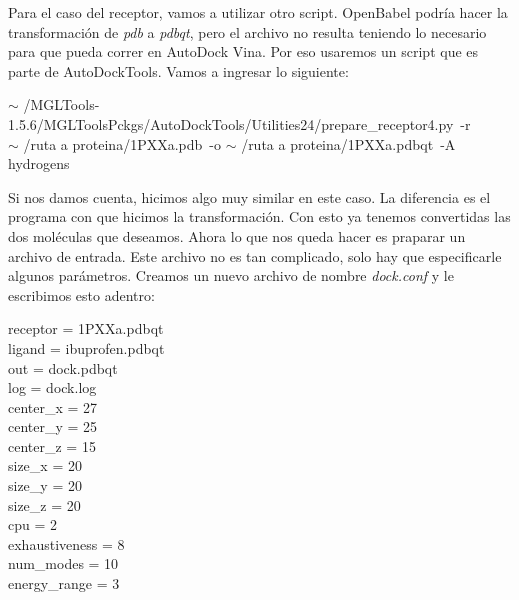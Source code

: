 \documentclass[10pt,letterpaper]{article}
\newenvironment{Code}
{
\begin{lrbox}{\selvestebox}%
\begin{minipage}{\dimexpr\columnwidth-2\fboxsep\relax}
\fontfamily{\ttdefault}\selectfont
}
{\end{minipage}\end{lrbox}%
\begin{center}
\colorbox{light-gray}{\usebox{\selvestebox}}
\end{center}
}
\begin{document}
Para el caso del receptor, vamos a utilizar otro script. OpenBabel podr\'ia hacer la transformaci\'on de \emph{pdb} a \emph{pdbqt}, pero el archivo no resulta teniendo lo necesario para que pueda correr en AutoDock Vina. Por eso usaremos un script que es parte de AutoDockTools. Vamos a ingresar lo siguiente:

\begin{flushleft}
\begin{Code}
$\sim$\hspace*{-2mm} /MGLTools-1.5.6/MGLToolsPckgs/AutoDockTools/Utilities24/prepare\_receptor4.py\ -r\\ \hspace*{4mm}$\sim$\hspace*{-2mm} /ruta a proteina/1PXXa.pdb\ -o $\sim$\hspace*{-2mm} /ruta a proteina/1PXXa.pdbqt\ -A hydrogens
\end{Code}
\end{flushleft}

Si nos damos cuenta, hicimos algo muy similar en este caso. La diferencia es el programa con que hicimos la transformaci\'on. Con esto ya tenemos convertidas las dos mol\'eculas que deseamos. Ahora lo que nos queda hacer es praparar un archivo de entrada. Este archivo no es tan complicado, solo hay que especificarle algunos par\'ametros. Creamos un nuevo archivo de nombre \emph{dock.conf} y le escribimos esto adentro:

\begin{Code}
receptor = 1PXXa.pdbqt\\
ligand = ibuprofen.pdbqt\\
out = dock.pdbqt\\
log = dock.log\\
center\_x = 27\\
center\_y = 25\\
center\_z = 15\\
size\_x = 20\\
size\_y = 20\\
size\_z = 20\\
cpu = 2\\
exhaustiveness = 8\\
num\_modes = 10\\
energy\_range = 3
\end{Code}
\end{document}
